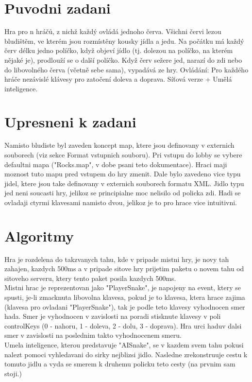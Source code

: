 \documentclass{article}
\begin{document}
\section*{Puvodni zadani}
Hra pro n hráčů, z nichž každý ovládá jednoho červa. Všichni červi lezou bludištěm, ve kterém jsou rozmístěny kousky jídla a jedu. Na počátku má každý červ délku jedno políčko, když objeví jídlo (tj. dolezou na políčko, na kterém nějaké je), prodlouží se o další políčko. Když červ sežere jed, narazí do zdi nebo do libovolného červa (včetně sebe sama), vypadává ze hry. Ovládání: Pro každého hráče nezávislé klávesy pro zatočení doleva a doprava. Síťová verze + Umělá inteligence.

\section*{Upresneni k zadani}
Namisto bludiste byl zaveden koncept map, ktere jsou definovany v externich souborech (viz sekce Format vstupnich souboru). Pri vstupu do lobby se vybere defaultni mapa ("Rocks.map", v dobe psani teto dokumentace). Hraci maji moznost tuto mapu pred vstupem do hry zmenit. Dale bylo zavedeno vice typu jidel, ktere jsou take definovany v externich souborech formatu XML. Jidlo typu jed neni soucasti hry, jelikoz se principialne moc nelisilo od policka zdi. Hadi se ovladaji ctyrmi klavesami namisto dvou, jelikoz je to pro hrace vice intuitivni.

\section*{Algoritmy}
Hra je rozdelena do takzvanych tahu, kde v pripade mistni hry, je novy tah zahajen, kazdych 500ms a v pripade sitove hry prijetim paketu o novem tahu od sitoveho serveru, ktery tento paket posila kazdych 500ms.\\

Mistni hrac je reprezentovan jako "PlayerSnake", je napojeny na event, ktery se spusti, je-li zmacknuta libovolna klavesa, pokud je to klavesa, ktera hrace zajima (klavesa pro ovladani "PlayerSnake"), tak je podle teto klavesy vyhodnocen smer hada. Smer je vyhodnocen v zavislosti na poradi stisknute klavesy v poli controlKeys (0 - nahoru, 1 - doleva, 2 - dolu, 3 - doprava). Hra urci haduv dalsi smer v zavislosti na poslednim takto vyhodnocenem smeru.\\

Umela inteligence, kterou predstavuje "AISnake", se v kazdem svem tahu pokusi nalezt pomoci vyhledavani do sirky nejblizsi jidlo. Nasledne zrekonstruuje cestu k tomuto jidlu a vyda se smerem k druhemu policku teto cesty (na prvnim sam stoji.)\\
\end{document}

